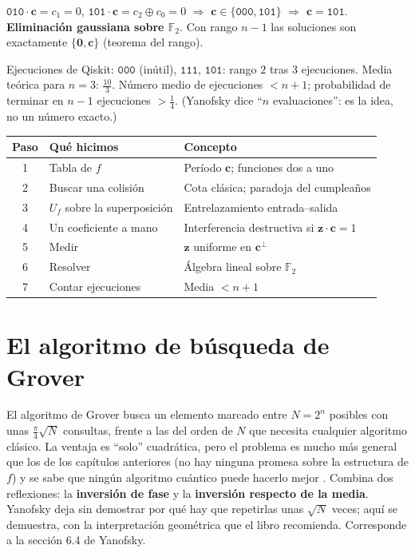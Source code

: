 \documentclass[11pt, a4paper, twoside, openright]{report}
\newcommand{\pasoguiado}[3]{%
\begin{tcolorbox}[colback=gray!6!white,colframe=gray!55!black,title={#1}]
#2
\tcblower
\small #3
\end{tcolorbox}}
\newcommand{\bz}{\mathbf{z}}
\newcommand{\bc}{\mathbf{c}}
\newcommand{\bcero}{\mathbf{0}}
\newcommand{\F}{\mathbb{F}_2}
\begin{document}
\pasoguiado{Paso 6. Ecuaciones}
{$\texttt{010}\cdot\bc = c_1 = 0$, \quad $\texttt{101}\cdot\bc = c_2\oplus c_0 = 0$ \;$\Rightarrow$\; $\bc\in\{\texttt{000}, \texttt{101}\}$ \;$\Rightarrow$\; $\bc = \texttt{101}$.}
{\textbf{Eliminación gaussiana sobre $\F$}. Con rango $n-1$ las soluciones son exactamente $\{\bcero,\bc\}$ (teorema del rango).}

\pasoguiado{Paso 7. Cuántas veces}
{Ejecuciones de Qiskit: $\texttt{000}$ (inútil), $\texttt{111}$, $\texttt{101}$: rango $2$ tras $3$ ejecuciones. Media teórica para $n = 3$: $\frac{10}{3}$.}
{Número medio de ejecuciones $< n+1$; probabilidad de terminar en $n-1$ ejecuciones $> \frac14$. (Yanofsky dice ``$n$ evaluaciones'': es la idea, no un número exacto.)}

\begin{center}
\small\renewcommand{\arraystretch}{1.15}
\begin{tabular}{c|l|l}
\textbf{Paso} & \textbf{Qué hicimos} & \textbf{Concepto} \\ \hline
1 & Tabla de $f$ & Período $\bc$; funciones dos a uno \\
2 & Buscar una colisión & Cota clásica; paradoja del cumpleaños \\
3 & $U_f$ sobre la superposición & Entrelazamiento entrada--salida \\
4 & Un coeficiente a mano & Interferencia destructiva si $\bz\cdot\bc = 1$ \\
5 & Medir & $\bz$ uniforme en $\bc^{\perp}$ \\
6 & Resolver & Álgebra lineal sobre $\F$ \\
7 & Contar ejecuciones & Media $< n+1$
\end{tabular}
\end{center}

\chapter{El algoritmo de búsqueda de Grover}

\noindent El algoritmo de Grover \cite{grover1996} busca un elemento marcado entre $N = 2^n$ posibles con unas $\frac{\pi}{4}\sqrt N$ consultas, frente a las del orden de $N$ que necesita cualquier algoritmo clásico. La ventaja es ``solo'' cuadrática, pero el problema es mucho más general que los de los capítulos anteriores (no hay ninguna promesa sobre la estructura de $f$) y se sabe que ningún algoritmo cuántico puede hacerlo mejor \cite{bennett1997}. Combina dos reflexiones: la \textbf{inversión de fase} y la \textbf{inversión respecto de la media}. Yanofsky deja sin demostrar por qué hay que repetirlas unas $\sqrt N$ veces; aquí se demuestra, con la interpretación geométrica que el libro recomienda. Corresponde a la sección 6.4 de Yanofsky.
\end{document}
